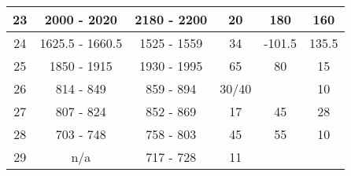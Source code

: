 \begin{table}[]
\begin{tabular}{|c|c|c|c|c|c|}
23                                                          & 2000 - 2020                                            & 2180 - 2200                                              & 20                                                                   & 180                                                              & 160                                                         \\ \hline
24                                                          & 1625.5 - 1660.5                                        & 1525 - 1559                                              & 34                                                                   & -101.5                                                           & 135.5                                                       \\ \hline
25                                                          & 1850 - 1915                                            & 1930 - 1995                                              & 65                                                                   & 80                                                               & 15                                                          \\ \hline
26                                                          & 814 - 849                                              & 859 - 894                                                & 30/40                                                                &                                                                  & 10                                                          \\ \hline
27                                                          & 807 - 824                                              & 852 - 869                                                & 17                                                                   & 45                                                               & 28                                                          \\ \hline
28                                                          & 703 - 748                                              & 758 - 803                                                & 45                                                                   & 55                                                               & 10                                                          \\ \hline
29                                                          & n/a                                                    & 717 - 728                                                & 11                                                                   &                                                                  &                                                             \\ \hline

\end{tabular}
\end{table}
